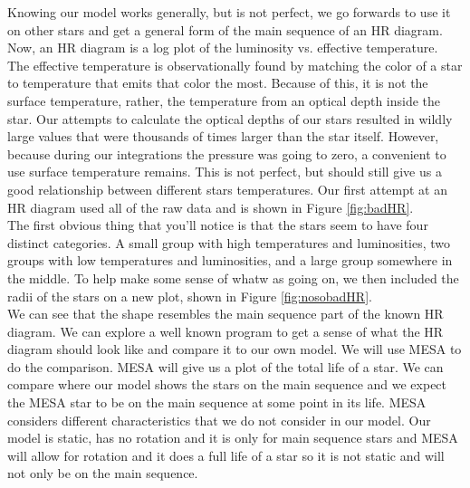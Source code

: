 \documentclass[10pt]{article}
\begin{document}
Knowing our model works generally, but is not perfect, we go forwards to use it on other stars and get a general form of the main sequence of an HR diagram. Now, an HR diagram is a log plot of the luminosity vs. effective temperature. The effective temperature is observationally found by matching the color of a star to temperature that emits that color the most. Because of this, it is not the surface temperature, rather, the temperature from an optical depth inside the star. Our attempts to calculate the optical depths of our stars resulted in wildly large values that were thousands of times larger than the star itself. However, because during our integrations the pressure was going to zero, a convenient to use surface temperature remains. This is not perfect, but should still give us a good relationship between different stars temperatures. Our first attempt at an HR diagram used all of the raw data and is shown in Figure \ref{fig:badHR}. \\

The first obvious thing that you'll notice is that the stars seem to have four distinct categories. A small group with high temperatures and luminosities, two groups with low temperatures and luminosities, and a large group somewhere in the middle. To help make some sense of whatw as going on, we then included the radii of the stars on a new plot, shown in Figure \ref{fig:nosobadHR}. \\

We can see that the shape resembles the main sequence part of the known HR diagram. We can explore a well known program to get a sense of what the HR diagram should look like and compare it to our own model. We will use MESA to do the comparison. MESA will give us a plot of the total life of a star. We can compare where our model shows the stars on the main sequence and we expect the MESA star to be on the main sequence at some point in its life. MESA considers different characteristics that  we do not consider in our model. Our model is static, has no rotation and it is only for main sequence stars and MESA will allow for rotation and it does a full life of a star so it is not static and will not only be on the main sequence. \\ 
\end{document}
